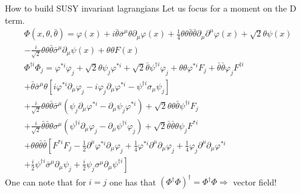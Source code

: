 \documentclass[10pt]{beamer}
\begin{document}
\begin{frame}{How to build SUSY invariant lagrangians}
    Let us focus for a moment on the D term.
    \begin{gather*}
        \Phi(x, \theta, \bar\theta) = \varphi(x) + i\bar\theta \bar\sigma^{\mu}\theta \partial_{\mu}\varphi(x) + \frac{1}{4}\theta\theta\bar\theta\bar\theta\partial_{\mu}\partial^{\mu}\varphi(x) + \sqrt{2}\theta\psi(x)\\ 
        -\frac{i}{\sqrt{2}}\theta\theta\bar\theta\bar\sigma^{\mu}\partial_{\mu}\psi(x) + \theta\theta F(x) \\
        \Phi^{\dagger i} \Phi_{j}= \varphi^{* i} \varphi_{j}+\sqrt{2} \theta \psi_{j} \varphi^{* i}+\sqrt{2} \bar\theta \psi^{\dagger i} \varphi_{j}+\theta \theta \varphi^{* i} F_{j}+\bar\theta \bar\theta \varphi_{j} F^{\dagger i} \\
            +\bar\theta \bar{\sigma}^{\mu} \theta\left[i \varphi^{* i} \partial_{\mu} \varphi_{j}-i \varphi_{j} \partial_{\mu} \varphi^{* i}-\psi^{\dagger i} \sigma_{\mu} \psi_{j}\right] \\
                +\frac{i}{\sqrt{2}} \theta \theta \bar\theta \bar{\sigma}^{\mu}\left(\psi_{j} \partial_{\mu} \varphi^{* i}-\partial_{\mu} \psi_{j} \varphi^{* i}\right)+\sqrt{2} \theta \theta \bar\theta \psi^{\dagger i} F_{j} \\
                +\frac{i}{\sqrt{2}} \bar\theta \bar\theta \theta \sigma^{\mu}\left(\psi^{\dagger i} \partial_{\mu} \varphi_{j}-\partial_{\mu} \psi^{\dagger i} \varphi_{j}\right)+\sqrt{2} \bar\theta \bar\theta \theta \psi_{j} F^{* i} \\
                +\theta \theta \bar\theta \bar\theta\left[F^{* i} F_{j}-\frac{1}{2} \partial^{\mu} \varphi^{* i} \partial_{\mu} \varphi_{j}+\frac{1}{4} \varphi^{* i} \partial^{\mu} \partial_{\mu} \varphi_{j}+\frac{1}{4} \varphi_{j} \partial^{\mu} \partial_{\mu} \varphi^{* i}\right. \\
                \left.+\frac{i}{2} \psi^{\dagger i} \bar{\sigma}^{\mu} \partial_{\mu} \psi_{j}+\frac{i}{2} \psi_{j} \sigma^{\mu} \partial_{\mu} \psi^{\dagger i}\right]
    \end{gather*}
    One can note that for $i=j$ one has that $(\Phi^{\dagger}\Phi)^{\dagger} = \Phi^{\dagger}\Phi \Rightarrow$ vector field!
\end{frame}
\end{document}
